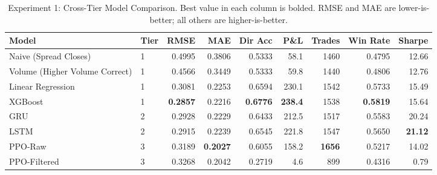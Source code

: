 \begin{table}[htbp]
\centering
\caption{Experiment 1: Cross-Tier Model Comparison. Best value in each column is bolded. RMSE and MAE are lower-is-better; all others are higher-is-better.}
\label{tab:experiment1}
\begin{tabular}{llrrrrrrr}
\toprule
Model & Tier & RMSE & MAE & Dir Acc & P\&L & Trades & Win Rate & Sharpe \\
\midrule
Naive (Spread Closes) & 1 & 0.4995 & 0.3806 & 0.5333 & 58.1 & 1460 & 0.4795 & 12.66 \\
Volume (Higher Volume Correct) & 1 & 0.4566 & 0.3449 & 0.5333 & 59.8 & 1440 & 0.4806 & 12.76 \\
Linear Regression & 1 & 0.3081 & 0.2253 & 0.6594 & 230.1 & 1542 & 0.5733 & 15.49 \\
XGBoost & 1 & \textbf{0.2857} & 0.2216 & \textbf{0.6776} & \textbf{238.4} & 1538 & \textbf{0.5819} & 15.64 \\
\midrule
GRU & 2 & 0.2928 & 0.2229 & 0.6433 & 212.5 & 1517 & 0.5583 & 20.24 \\
LSTM & 2 & 0.2915 & 0.2239 & 0.6545 & 221.8 & 1547 & 0.5650 & \textbf{21.12} \\
\midrule
PPO-Raw & 3 & 0.3189 & \textbf{0.2027} & 0.6055 & 158.2 & \textbf{1656} & 0.5217 & 14.02 \\
PPO-Filtered & 3 & 0.3268 & 0.2042 & 0.2719 & 4.6 & 899 & 0.4316 & 0.79 \\
\bottomrule
\end{tabular}
\end{table}
